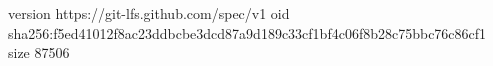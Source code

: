 version https://git-lfs.github.com/spec/v1
oid sha256:f5ed41012f8ac23ddbcbe3dcd87a9d189c33cf1bf4c06f8b28c75bbc76c86cf1
size 87506
